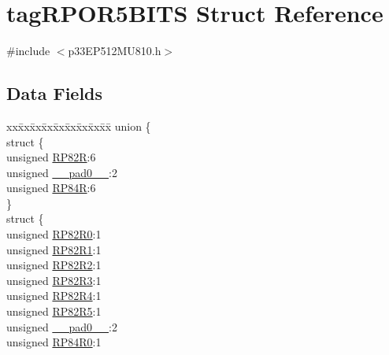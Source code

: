 \hypertarget{structtag_r_p_o_r5_b_i_t_s}{}\section{tag\+R\+P\+O\+R5\+B\+I\+TS Struct Reference}
\label{structtag_r_p_o_r5_b_i_t_s}


{\ttfamily \#include $<$p33\+E\+P512\+M\+U810.\+h$>$}

\subsection*{Data Fields}
\begin{DoxyCompactItemize}
\item 
\begin{tabbing}
xx\=xx\=xx\=xx\=xx\=xx\=xx\=xx\=xx\=\kill
union \{\\
\>struct \{\\
\>\>unsigned \hyperlink{structtag_r_p_o_r5_b_i_t_s_a4f1901a25eebd080b7155d2142b67827}{RP82R}:6\\
\>\>unsigned \hyperlink{structtag_r_p_o_r5_b_i_t_s_adf71f3d8410c1f1dbbc96680a92c49af}{\_\_pad0\_\_}:2\\
\>\>unsigned \hyperlink{structtag_r_p_o_r5_b_i_t_s_a03d73edb9dbac3a1971b0ad2843f3e03}{RP84R}:6\\
\>\} \\
\>struct \{\\
\>\>unsigned \hyperlink{structtag_r_p_o_r5_b_i_t_s_a96696c067354771ec57ec893b26eac4f}{RP82R0}:1\\
\>\>unsigned \hyperlink{structtag_r_p_o_r5_b_i_t_s_ab360df00f5d986bd015236ab45aabc35}{RP82R1}:1\\
\>\>unsigned \hyperlink{structtag_r_p_o_r5_b_i_t_s_a70f668d6db6d578bd126824b5a77aa8f}{RP82R2}:1\\
\>\>unsigned \hyperlink{structtag_r_p_o_r5_b_i_t_s_ada333bee3cdb9ce0e489f49d39a17fd6}{RP82R3}:1\\
\>\>unsigned \hyperlink{structtag_r_p_o_r5_b_i_t_s_a3ded486b060b8afcd90725aaac94ccb4}{RP82R4}:1\\
\>\>unsigned \hyperlink{structtag_r_p_o_r5_b_i_t_s_ab62020cc25daba4fbdc0d064a0dbf51e}{RP82R5}:1\\
\>\>unsigned \hyperlink{structtag_r_p_o_r5_b_i_t_s_adf71f3d8410c1f1dbbc96680a92c49af}{\_\_pad0\_\_}:2\\
\>\>unsigned \hyperlink{structtag_r_p_o_r5_b_i_t_s_a9b15ad1ba26ca32242a734f12bf81ef7}{RP84R0}:1\\

\end{tabbing}
\end{DoxyCompactItemize}
